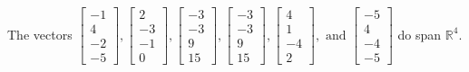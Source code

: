 \begin{exercise}
\begin{exerciseStatement}
  \end{exerciseStatement}
  \begin{exerciseAnswer}
   The vectors \(\left[\begin{array}{r}
-1 \\
4 \\
-2 \\
-5
\end{array}\right] , \left[\begin{array}{r}
2 \\
-3 \\
-1 \\
0
\end{array}\right] , \left[\begin{array}{r}
-3 \\
-3 \\
9 \\
15
\end{array}\right] , \left[\begin{array}{r}
-3 \\
-3 \\
9 \\
15
\end{array}\right] , \left[\begin{array}{r}
4 \\
1 \\
-4 \\
2
\end{array}\right] , \text{ and } \left[\begin{array}{r}
-5 \\
4 \\
-4 \\
-5
\end{array}\right]\) 
  	 do  
	span \(\mathbb{R}^4\).
  


  \end{exerciseAnswer}
\end{exercise}